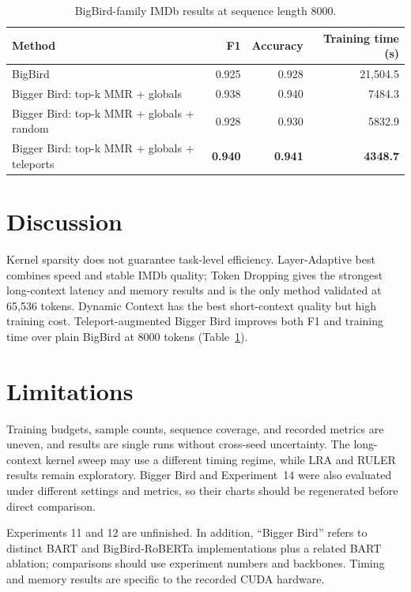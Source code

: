 \documentclass[11pt]{article}
\begin{document}
\begin{table}[ht]
  \centering
  \small
  \caption{BigBird-family IMDb results at sequence length 8000.}
  \label{tab:bigbird-8000}
  \begin{tabular}{@{}lrrr@{}}
    \toprule
    Method & F1 & Accuracy & Training time (s) \\
    \midrule
    BigBird & 0.925 & 0.928 & 21{,}504.5 \\
    Bigger Bird: top-k MMR + globals & 0.938 & 0.940 & 7484.3 \\
    Bigger Bird: top-k MMR + globals + random & 0.928 & 0.930 & 5832.9 \\
    Bigger Bird: top-k MMR + globals + teleports & \textbf{0.940} & \textbf{0.941} & \textbf{4348.7} \\
    \bottomrule
  \end{tabular}
\end{table}

\section{Discussion}

Kernel sparsity does not guarantee task-level efficiency. Layer-Adaptive best
combines speed and stable IMDb quality; Token Dropping gives the strongest
long-context latency and memory results and is the only method validated at
65{,}536 tokens. Dynamic Context has the best short-context quality but high
training cost. Teleport-augmented Bigger Bird improves both F1 and training
time over plain BigBird at 8000 tokens (Table~\ref{tab:bigbird-8000}).

\section{Limitations}
\label{sec:limitations}

Training budgets, sample counts, sequence coverage, and recorded metrics are
uneven, and results are single runs without cross-seed uncertainty. The
long-context kernel sweep may use a different timing regime, while LRA and
RULER results remain exploratory. Bigger Bird and Experiment~14 were also
evaluated under different settings and metrics, so their charts should be
regenerated before direct comparison.

Experiments 11 and 12 are unfinished. In addition, ``Bigger Bird'' refers to
distinct BART and BigBird-RoBERTa implementations plus a related BART ablation;
comparisons should use experiment numbers and backbones. Timing and memory
results are specific to the recorded CUDA hardware.


\clearpage
\appendix

\end{document}
